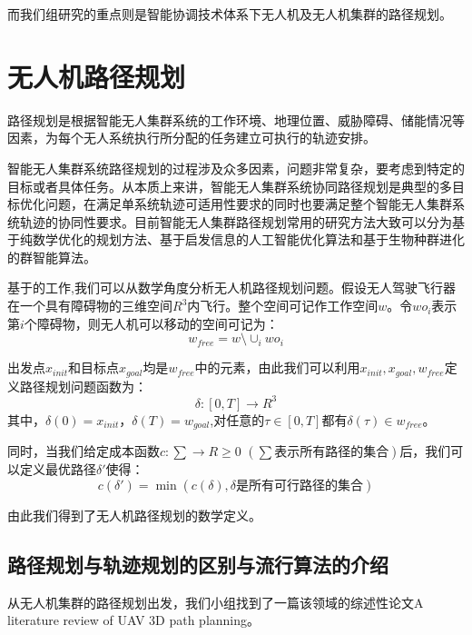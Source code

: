 \documentclass[conference]{IEEEtran}
\begin{document}
而我们组研究的重点则是智能协调技术体系下无人机及无人机集群的路径规划。


\section{无人机路径规划}%

路径规划是根据智能无人集群系统的工作环境、地理位置、威胁障碍、储能情况等因素，为每个无人系统执行所分配的任务建立可执行的轨迹安排。

智能无人集群系统路径规划的过程涉及众多因素，问题非常复杂，要考虑到特定的目标或者具体任务。从本质上来讲，智能无人集群系统协同路径规划是典型的多目标优化问题，在满足单系统轨迹可适用性要求的同时也要满足整个智能无人集群系统轨迹的协同性要求。目前智能无人集群路径规划常用的研究方法大致可以分为基于纯数学优化的规划方法、基于启发信息的人工智能优化算法和基于生物种群进化的群智能算法。

基于\cite{路径规划数学定义1,路径规划数学定义2,路径规划数学定义3,路径规划数学定义4}的工作,我们可以从数学角度分析无人机路径规划问题。假设无人驾驶飞行器在一个具有障碍物的三维空间$R^3$内飞行。整个空间可记作工作空间$w$。令$wo_i$表示第$i$个障碍物，则无人机可以移动的空间可记为：
\begin{equation}
    w_{free}=w \setminus \cup_i wo_i
\end{equation}

出发点$x_{init}$和目标点$x_{goal}$均是$w_{free}$中的元素，由此我们可以利用$x_{init},x_{goal},w_{free}$定义路径规划问题函数为：
\begin{equation}
    \delta:[0,T]\rightarrow R^3
\end{equation}
其中，$\delta (0)=x_{init}$，$\delta (T)=w_{goal}$,对任意的$\tau \in [0,T]$都有$\delta(\tau) \in w_{free}$。

同时，当我们给定成本函数$c: \sum \rightarrow R \geq0$  $( \sum \mbox{表示所有路径的集合})$后，我们可以定义最优路径$\delta'$使得：
\begin{equation}
    c(\delta')= \min (c(\delta),\delta \mbox{是所有可行路径的集合})
\end{equation}

由此我们得到了无人机路径规划的数学定义。


\subsection{路径规划与轨迹规划的区别与流行算法的介绍}%

从无人机集群的路径规划出发，我们小组找到了一篇该领域的综述性论文A literature review of UAV 3D path planning\cite{无人机路径规划综述}。
\end{document}
